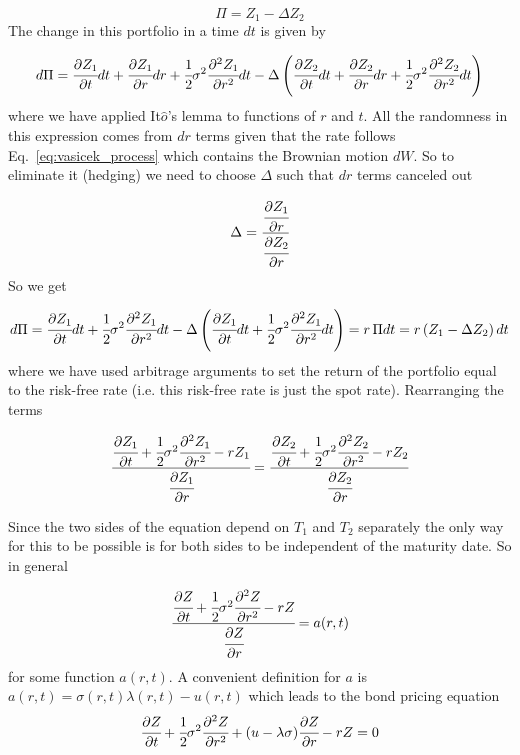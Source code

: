 \begin{equation*}
\Pi = Z_1 − \Delta Z_2
\end{equation*}
The change in this portfolio in a time $dt$ is given by

\begin{equation*}
d\Pi = \cfrac{\partial Z_1}{\partial t}dt + \cfrac{\partial Z_1}{\partial r}dr + \cfrac{1}{2}\sigma^2 \cfrac{\partial^2 Z_1}{\partial r^2}dt - \Delta\left(\cfrac{\partial Z_2}{\partial t}dt + \cfrac{\partial Z_2}{\partial r}dr + \cfrac{1}{2}\sigma^2 \cfrac{\partial^2 Z_2}{\partial r^2}dt\right)
\end{equation*}
where we have applied It$\hat{o}$'s lemma to functions of $r$ and $t$. All the randomness in this expression comes from $dr$ terms given that the rate follows Eq.~\ref{eq:vasicek_process} which contains the Brownian motion $dW$. So to eliminate it (hedging) we need to choose $\Delta$ such that $dr$ terms canceled out

\begin{equation*}
\Delta = \cfrac{\cfrac{\partial Z_1}{\partial r}}{\cfrac{\partial Z_2}{\partial r}}
\end{equation*}
So we get

\begin{equation*}
d\Pi = \cfrac{\partial Z_1}{\partial t}dt + \cfrac{1}{2}\sigma^2 \cfrac{\partial^2 Z_1}{\partial r^2}dt - \Delta\left(\cfrac{\partial Z_1}{\partial t}dt + \cfrac{1}{2}\sigma^2 \cfrac{\partial^2 Z_1}{\partial r^2}dt\right) = r\, \Pi dt = r \left(Z_1 - \Delta Z_2\right)dt
\end{equation*}
where we have used arbitrage arguments to set the return of the portfolio equal to the risk-free rate (i.e. this risk-free rate is just the spot rate). Rearranging the terms

\begin{equation*}
\cfrac{\cfrac{\partial Z_1}{\partial t} + \cfrac{1}{2}\sigma^2 \cfrac{\partial^2 Z_1}{\partial r^2} - rZ_1}{\cfrac{\partial Z_1}{\partial r}}=\cfrac{\cfrac{\partial Z_2}{\partial t} + \cfrac{1}{2}\sigma^2 \cfrac{\partial^2 Z_2}{\partial r^2} - rZ_2}{\cfrac{\partial Z_2}{\partial r}}
\end{equation*}

Since the two sides of the equation depend on $T_1$ and $T_2$ separately the only way for this to be possible is for both sides to be independent of the maturity date. So in general

\begin{equation*}
\cfrac{\cfrac{\partial Z}{\partial t} + \cfrac{1}{2}\sigma^2 \cfrac{\partial^2 Z}{\partial r^2} - rZ}{\cfrac{\partial Z}{\partial r}}= a(r, t)
\end{equation*}
for some function $a(r, t)$. A convenient definition for $a$ is $a(r, t) = \sigma(r, t )\lambda(r, t) − u(r, t)$ which leads to the bond pricing equation
\begin{equation}
\cfrac{\partial Z}{\partial t} + \cfrac{1}{2}\sigma^2 \cfrac{\partial^2 Z}{\partial r^2} + (u - \lambda\sigma)\cfrac{\partial Z}{\partial r} - rZ = 0
\label{eq:bond_pricing_equation}
\end{equation}

